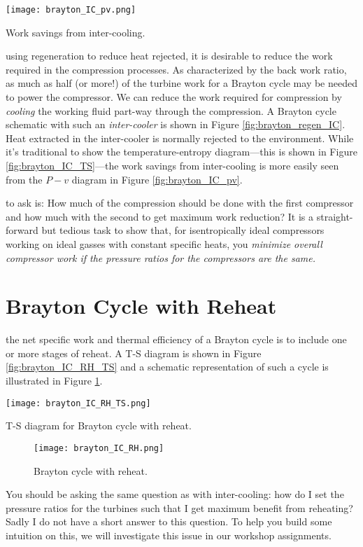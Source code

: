 \begin{marginfigure}
\texttt{[image: brayton\_IC\_pv.png]}
\caption{Work savings from inter-cooling.}
\label{fig:brayton_IC_pv}
\end{marginfigure}
 using regeneration to reduce heat rejected, it is desirable to reduce the work required in the compression processes.  As characterized by the back work ratio, as much as half (or more!) of the turbine work for a Brayton cycle may be needed to power the compressor.  We can reduce the work required for compression by \emph{cooling} the working fluid part-way through the compression.  A Brayton cycle schematic with such an \emph{inter-cooler} is shown in Figure \ref{fig:brayton_regen_IC}. Heat extracted in the inter-cooler is normally rejected to the environment.  While it's traditional to show the temperature-entropy diagram---this is shown in Figure \ref{fig:brayton_IC_TS}---the work savings from inter-cooling is more easily seen from the $P-v$ diagram in Figure \ref{fig:brayton_IC_pv}. 



 to ask is: How much of the compression should be done with the first compressor and how much with the second to get maximum work reduction?  It is a straight-forward but tedious task to show that, for isentropically ideal compressors working on ideal gasses with constant specific heats, you \emph{minimize overall compressor work if the pressure ratios for the compressors are the same.}  


\section{Brayton Cycle with Reheat}


 the net specific work and thermal efficiency of a Brayton cycle is to include one or more stages of reheat.  A T-S diagram is shown in Figure \ref{fig:brayton_IC_RH_TS} and a schematic representation of such a cycle is illustrated in Figure \ref{fig:brayton_IC_RH}.
\begin{marginfigure}
\texttt{[image: brayton\_IC\_RH\_TS.png]}
\caption{T-S diagram for Brayton cycle with reheat.}
\label{fig:brayton_IC_RH_TS}
\end{marginfigure}

\begin{figure}
\texttt{[image: brayton\_IC\_RH.png]}
\caption{Brayton cycle with reheat.}
\label{fig:brayton_IC_RH}
\end{figure}

You should be asking the same question as with inter-cooling: how do I set the pressure ratios for the turbines such that I get maximum benefit from reheating?  Sadly I do not have a short answer to this question. To help you build some intuition on this, we will investigate this issue in our workshop assignments.


